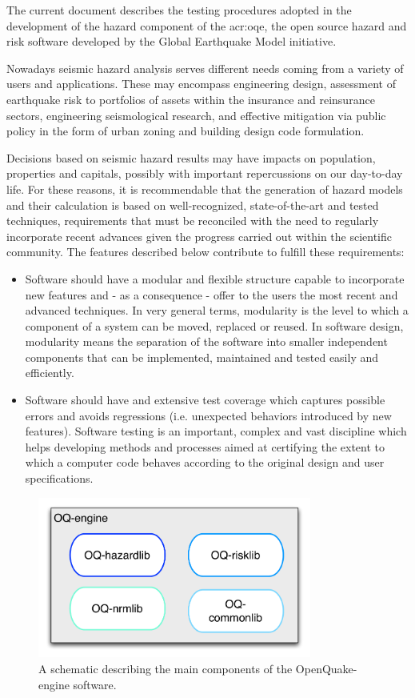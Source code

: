 The current document describes the testing procedures adopted in 
the development of the hazard component of the \gls{acr:oqe}, the 
open source hazard and risk software developed by the Global 
Earthquake Model initiative.

Nowadays seismic hazard analysis serves different needs coming 
from a variety of users and applications. 
%
These may encompass engineering design, assessment of earthquake risk 
to portfolios of assets within the insurance and reinsurance sectors, 
engineering seismological research, and effective mitigation via public 
policy in the form of urban zoning and building design code formulation.

Decisions based on seismic hazard results may have impacts on
population, properties and capitals, possibly with important repercussions 
on our day-to-day life. For these reasons, it is recommendable that 
the generation of hazard models and their calculation is based on 
well-recognized, state-of-the-art and tested techniques, requirements 
that must be reconciled with the need to regularly incorporate 
recent advances given the progress carried out within the 
scientific community. 
%
The features described below contribute to fulfill these requirements: 
%
\begin{itemize}
    \item Software should have a modular and flexible structure capable to 
    incorporate new features and - as a consequence - offer to the users 
    the most recent and advanced techniques. 
    In very general terms, modularity is the level to which a component 
    of a system can be moved, replaced or reused. 
    In software design, modularity means the separation of the software
    into smaller independent components that can be implemented, maintained 
    and tested easily and efficiently.
    \item Software should have and extensive test coverage which captures 
    possible errors and avoids regressions (i.e. unexpected behaviors 
    introduced by new features).
    Software testing \parencite{myers2012} is an important, complex and 
    vast discipline which helps developing methods and processes aimed at 
    certifying the extent to which a computer code behaves according 
    to the original design and user specifications.
\end{itemize}
\begin{figure}[!ht]
\centering
\includegraphics[width=9cm]{./Pictures/qa/oq-engine_structure.pdf}
\caption{A schematic describing the main components of the OpenQuake-engine 
    software.}
\label{fig:oqe_structure}
\end{figure}
